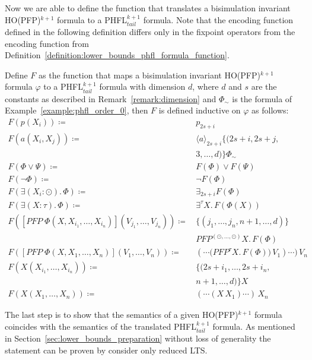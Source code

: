 Now we are able to define the function that translates a bisimulation invariant HO(PFP)$^{k+1}$
formula to a PHFL$^{k+1}_{tail}$ formula. Note that the encoding function defined in the following definition differs only in the fixpoint operators from the encoding function from Definition~\ref{definition:lower_bounds_phfl_formula_function}.

\begin{definition}
    \label{definition:lower_bounds_phfl_formula_function_pfp}
   Define $F$ as the function that maps a bisimulation invariant HO(PFP)$^{k+1}$ formula $\varphi$ to a PHFL$^{k+1}_{tail}$ formula with dimension $d$, where $d$ and $s$ are the constants as described in Remark~\ref{remark:dimension} and $\Phi_\sim$ is the formula of Example~\ref{example:phfl_order_0}, then $F$ is defined
    inductive on $\varphi$ as follows:
    \begin{align*}
        F(p(X_i)) \coloneqq &\, p_{2s+i} \\
        F(a(X_i, X_j)) \coloneqq &\, \langle a \rangle_{2s+i} \{(2s+i, 2s+j, \\
        &\,3, \dots, d)\} \Phi_\sim \\
        F(\Phi \vee \Psi) \coloneqq &\, F(\Phi) \vee F(\Psi) \\
        F(\neg \Phi) \coloneqq &\, \neg F(\Phi) \\
        F(\exists (X_i \colon \odot).\,\Phi) \coloneqq &\, \exists_{2s+i} F(\Phi) \\
        F(\exists (X \colon \tau).\,\Phi) \coloneqq &\, \exists^\tau X.\,F(\Phi(X)) \\
        F([PFP\;\Phi(X, X_{i_1}, \dots, X_{i_n})](V_{j_1}, \dots, V_{j_n})) \coloneqq &\,\{(j_1, \dots, j_n, n + 1, \dots, d)\} \\
        &\,PFP^{(\odot, \dots, \odot)} X.\, F(\Phi) \\
        F([PFP\;\Phi(X, X_1, \dots, X_n)](V_1, \dots, V_n)) \coloneqq &\,(\dotsb \big(PFP^\tau X.\, F(\Phi)\big)\,V_1)\dotsb)\,V_n \\
        F(X(X_{i_1}, \dots, X_{i_n})) \coloneqq &\, \{(2s+i_1, \dots, 2s+i_n, \\
        &\,n + 1, \dots, d)\}X\\
        F(X(X_1, \dots, X_n)) \coloneqq &\, (\dotsb (X\,X_1)\dotsb)\,X_n
    \end{align*}
\end{definition}

The last step is to show that the semantics of a given HO(PFP)$^{k+1}$ formula coincides with the semantics of the translated PHFL$^{k+1}_{tail}$ formula. As mentioned in Section~\ref{sec:lower_bounds_preparation} without loss of generality the statement can be proven by consider only  reduced LTS. 

